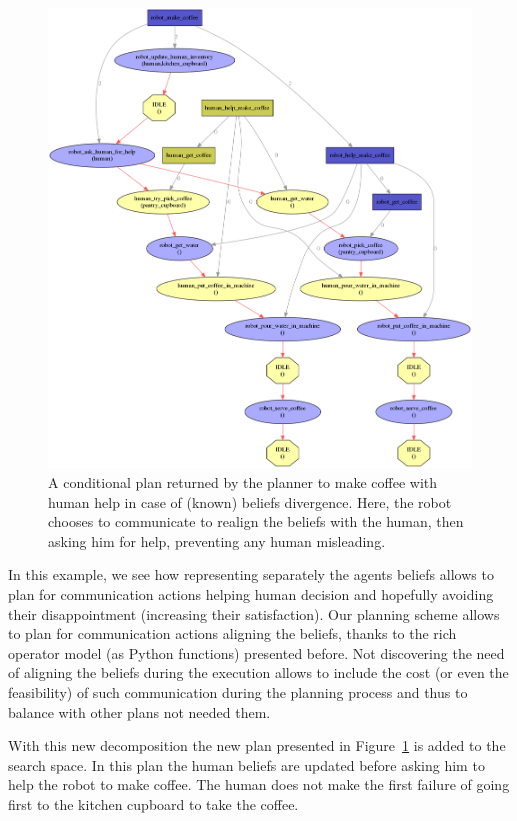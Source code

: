 \documentclass[a4paper,11pt,twoside]{StyleThese}
\begin{document}
\begin{figure}[hbtp]
\centering
\includegraphics[width=\textwidth]{figures/chapter4/Chap4CoopRealign.png}
\caption{A conditional plan returned by the planner to make coffee with human help in case of (known) beliefs divergence. Here, the robot chooses to communicate to realign the beliefs with the human, then asking him for help, preventing any human misleading.}
\label{fig:chap4beliefsdivwithalign}
\end{figure}

In this example, we see how representing separately the agents beliefs allows to plan for communication actions helping human decision and hopefully avoiding their disappointment (increasing their satisfaction). Our planning scheme allows to plan for communication actions aligning the beliefs, thanks to the rich operator model (as Python functions) presented before. Not discovering the need of aligning the beliefs during the execution allows to include the cost (or even the feasibility) of such communication during the planning process and thus to balance with other plans not needed them.

With this new decomposition the new plan presented in Figure~\ref{fig:chap4beliefsdivwithalign} is added to the search space. In this plan the human beliefs are updated before asking him to help the robot to make coffee. The human does not make the first failure of going first to the kitchen cupboard to take the coffee.
\end{document}
